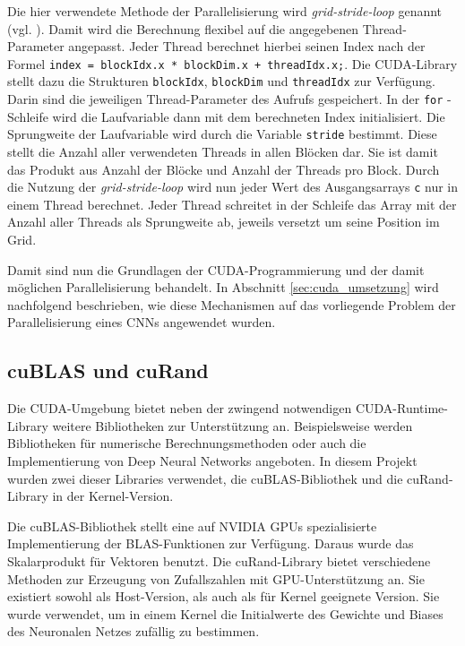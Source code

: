 \documentclass[../main.tex]{subfiles}
\begin{document}
Die hier verwendete Methode der Parallelisierung wird \emph{grid-stride-loop} genannt (vgl. \cite{CUDA_GRID_STRIDE}). Damit wird die Berechnung flexibel auf die angegebenen Thread-Parameter angepasst. Jeder Thread berechnet hierbei seinen Index nach der Formel \texttt{index = blockIdx.x * blockDim.x + threadIdx.x;}. Die CUDA-Library stellt dazu die Strukturen \texttt{blockIdx}, \texttt{blockDim} und \texttt{threadIdx} zur Verfügung. Darin sind die jeweiligen Thread-Parameter des Aufrufs gespeichert. In der \texttt{for} -Schleife wird die Laufvariable dann mit dem berechneten Index initialisiert. Die Sprungweite der Laufvariable wird durch die Variable \texttt{stride} bestimmt. Diese stellt die Anzahl aller verwendeten Threads in allen Blöcken dar. Sie ist damit das Produkt aus Anzahl der Blöcke und Anzahl der Threads pro Block. Durch die Nutzung der \emph{grid-stride-loop} wird nun jeder Wert des Ausgangsarrays \texttt{c} nur in einem Thread berechnet. Jeder Thread schreitet in der Schleife das Array mit der Anzahl aller Threads als Sprungweite ab, jeweils versetzt um seine Position im Grid. \par Damit sind nun die Grundlagen der CUDA-Programmierung und der damit möglichen Parallelisierung behandelt. In Abschnitt \ref{sec:cuda_umsetzung} wird nachfolgend beschrieben, wie diese Mechanismen auf das vorliegende Problem der Parallelisierung eines CNNs angewendet wurden. \par 
\subsection{cuBLAS und cuRand} \label{sec:cuda_cublas}
Die CUDA-Umgebung bietet neben der zwingend notwendigen CUDA-Runtime-Library weitere Bibliotheken zur Unterstützung an. Beispielsweise werden Bibliotheken für numerische Berechnungsmethoden oder auch die Implementierung von Deep Neural Networks angeboten. In diesem Projekt wurden zwei dieser Libraries verwendet, die cuBLAS-Bibliothek und die cuRand-Library in der Kernel-Version. \par Die cuBLAS-Bibliothek stellt eine auf NVIDIA GPUs spezialisierte Implementierung der BLAS-Funktionen zur Verfügung. Daraus wurde das Skalarprodukt für Vektoren benutzt. Die cuRand-Library bietet verschiedene Methoden zur Erzeugung von Zufallszahlen mit GPU-Unterstützung an. Sie existiert sowohl als Host-Version, als auch als für Kernel geeignete Version. Sie wurde verwendet, um in einem Kernel die Initialwerte des Gewichte und Biases des Neuronalen Netzes zufällig zu bestimmen. \par 
\end{document}
